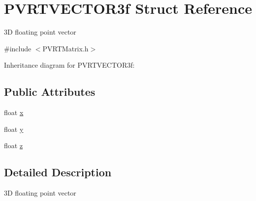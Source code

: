 \hypertarget{struct_p_v_r_t_v_e_c_t_o_r3f}{\section{P\+V\+R\+T\+V\+E\+C\+T\+O\+R3f Struct Reference}
\label{struct_p_v_r_t_v_e_c_t_o_r3f}
}


3\+D floating point vector  




{\ttfamily \#include $<$P\+V\+R\+T\+Matrix.\+h$>$}



Inheritance diagram for P\+V\+R\+T\+V\+E\+C\+T\+O\+R3f\+:
\subsection*{Public Attributes}
\begin{DoxyCompactItemize}
\item 
float \hyperlink{struct_p_v_r_t_v_e_c_t_o_r3f_adf8b2ea9a8c9bead165124ae1a2ac48d}{x}
\item 
float \hyperlink{struct_p_v_r_t_v_e_c_t_o_r3f_ae42f2f74d7c306f18971140fe4f3e669}{y}
\item 
float \hyperlink{struct_p_v_r_t_v_e_c_t_o_r3f_aaef9d57b2c8dbc6944dc704ccff65374}{z}
\end{DoxyCompactItemize}


\subsection{Detailed Description}
3\+D floating point vector 



 

